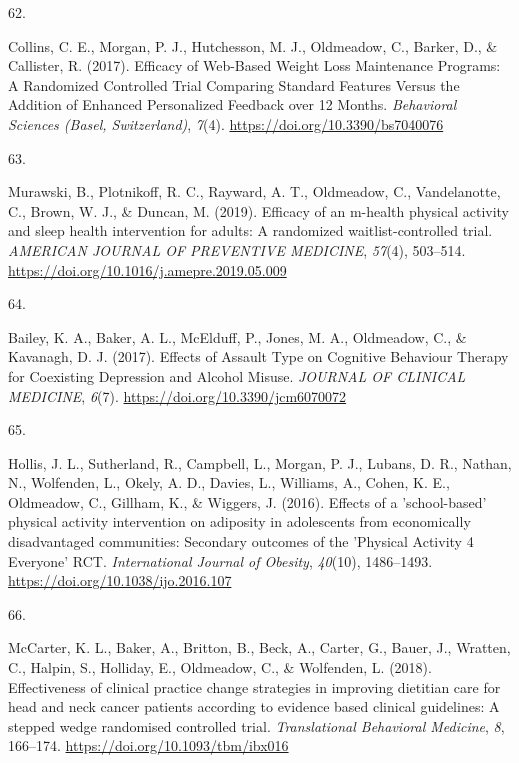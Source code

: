 \documentclass[11pt, a4paper]{awesome-cv}
\newlength{\csllabelwidth}
\newcommand{\CSLLeftMargin}[1]{\parbox[t]{\csllabelwidth}{#1}}
\newcommand{\CSLRightInline}[1]{\parbox[t]{\linewidth - \csllabelwidth}{#1}}
\begin{document}
\leavevmode\hypertarget{ref-collins_efficacy_2017}{}%
\CSLLeftMargin{62. }
\CSLRightInline{Collins, C. E., Morgan, P. J., Hutchesson, M. J.,
Oldmeadow, C., Barker, D., \& Callister, R. (2017). Efficacy of
Web-Based Weight Loss Maintenance Programs: A Randomized Controlled
Trial Comparing Standard Features Versus the Addition of Enhanced
Personalized Feedback over 12 Months. \emph{Behavioral Sciences (Basel,
Switzerland)}, \emph{7}(4). \url{https://doi.org/10.3390/bs7040076}}

\leavevmode\hypertarget{ref-murawski_efficacy_2019}{}%
\CSLLeftMargin{63. }
\CSLRightInline{Murawski, B., Plotnikoff, R. C., Rayward, A. T.,
Oldmeadow, C., Vandelanotte, C., Brown, W. J., \& Duncan, M. (2019).
Efficacy of an m-health physical activity and sleep health intervention
for adults: A randomized waitlist-controlled trial. \emph{AMERICAN
JOURNAL OF PREVENTIVE MEDICINE}, \emph{57}(4), 503--514.
\url{https://doi.org/10.1016/j.amepre.2019.05.009}}

\leavevmode\hypertarget{ref-bailey_effects_2017}{}%
\CSLLeftMargin{64. }
\CSLRightInline{Bailey, K. A., Baker, A. L., McElduff, P., Jones, M. A.,
Oldmeadow, C., \& Kavanagh, D. J. (2017). Effects of Assault Type on
Cognitive Behaviour Therapy for Coexisting Depression and Alcohol
Misuse. \emph{JOURNAL OF CLINICAL MEDICINE}, \emph{6}(7).
\url{https://doi.org/10.3390/jcm6070072}}

\leavevmode\hypertarget{ref-hollis_effects_2016}{}%
\CSLLeftMargin{65. }
\CSLRightInline{Hollis, J. L., Sutherland, R., Campbell, L., Morgan, P.
J., Lubans, D. R., Nathan, N., Wolfenden, L., Okely, A. D., Davies, L.,
Williams, A., Cohen, K. E., Oldmeadow, C., Gillham, K., \& Wiggers, J.
(2016). Effects of a 'school-based' physical activity intervention on
adiposity in adolescents from economically disadvantaged communities:
Secondary outcomes of the 'Physical Activity 4 Everyone' RCT.
\emph{International Journal of Obesity}, \emph{40}(10), 1486--1493.
\url{https://doi.org/10.1038/ijo.2016.107}}

\leavevmode\hypertarget{ref-mccarter_effectiveness_2018}{}%
\CSLLeftMargin{66. }
\CSLRightInline{McCarter, K. L., Baker, A., Britton, B., Beck, A.,
Carter, G., Bauer, J., Wratten, C., Halpin, S., Holliday, E., Oldmeadow,
C., \& Wolfenden, L. (2018). Effectiveness of clinical practice change
strategies in improving dietitian care for head and neck cancer patients
according to evidence based clinical guidelines: A stepped wedge
randomised controlled trial. \emph{Translational Behavioral Medicine},
\emph{8}, 166--174. \url{https://doi.org/10.1093/tbm/ibx016}}
\end{document}
